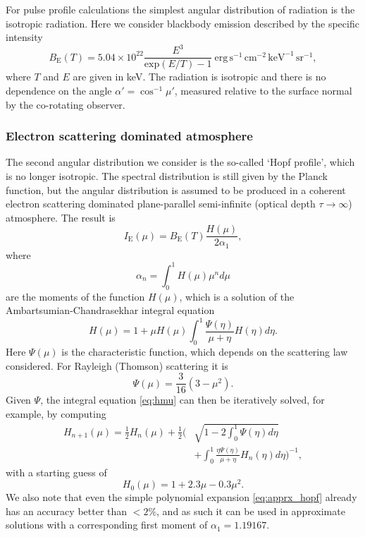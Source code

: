 \documentclass{aa}
\begin{document}
For pulse profile calculations the simplest angular distribution of radiation is the isotropic radiation.
Here we consider blackbody emission described by the specific intensity
\begin{equation}
  B_{\mathrm{E}}(T) = 5.04 \times 10^{22} \frac{E^3}{\mathrm{exp}(E/T) -1}~\mathrm{erg}\,\mathrm{s}^{-1}\,\mathrm{cm}^{-2}\,\mathrm{keV}^{-1}\,\mathrm{sr}^{-1},
\end{equation}
where $T$ and $E$ are given in keV.
The radiation is isotropic and there is no dependence on the angle $\alpha'=\cos^{-1}\mu'$, measured relative to the surface normal by the co-rotating observer.

\subsubsection{Electron scattering dominated atmosphere}

The second angular distribution we consider is the so-called `Hopf profile', which is no longer isotropic.
The spectral distribution is still given by the Planck function, but the angular distribution is assumed to be produced in a coherent electron scattering dominated plane-parallel semi-infinite (optical depth $\tau \rightarrow \infty$) atmosphere.
The result is
\begin{equation}
  I_{\mathrm{E}}(\mu) = B_{\mathrm{E}}(T) \frac{H(\mu)}{2\alpha_1},
\end{equation}
where
\begin{equation}
  \alpha_n = \int_0^1 H(\mu) \mu^n d\mu
\end{equation}
are the moments of the function $H(\mu)$, which is a solution of the Ambartsumian-Chandrasekhar integral equation \citep[see e.g.][]{Cha60,Sob63}
\begin{equation}\label{eq:hmu}
  H(\mu) = 1 + \mu H(\mu) \int_0^1 \frac{\Psi(\eta)}{\mu + \eta} H(\eta) d\eta.
\end{equation}
Here $\Psi(\mu)$ is the characteristic function, which depends on the scattering law considered.
For Rayleigh (Thomson) scattering it is
\begin{equation}
  \Psi(\mu) = \frac{3}{16}(3-\mu^2).
\end{equation}
Given $\Psi$, the integral equation \eqref{eq:hmu} can then be iteratively solved, for example, by computing
\begin{equation}\begin{split}
    H_{n+1}(\mu) =  \frac{1}{2} H_n(\mu) + \frac{1}{2}\Biggl(& \sqrt{1-2\int_0^1 \Psi(\eta)d\eta} \\
                    &+ \int_0^1 \frac{\eta \Psi(\eta)}{\mu + \eta} H_n(\eta) d\eta \Biggr)^{-1},
\end{split}\end{equation}
with a starting guess of
\begin{equation}\label{eq:apprx_hopf}
  H_0(\mu) = 1 + 2.3\mu - 0.3\mu^2.
\end{equation}
We also note that even the simple polynomial expansion \eqref{eq:apprx_hopf} already has an accuracy better than $<2\%$, and as such it can be used in approximate solutions with a corresponding first moment of $\alpha_1 = 1.19167$.
\end{document}
